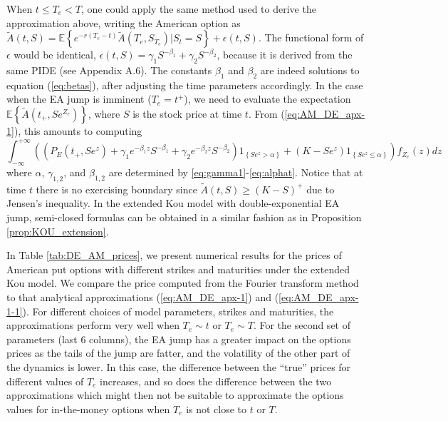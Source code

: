 \documentclass[11pt]{article}
\numberwithin{equation}{section}
\numberwithin{theorem}{section}
\begin{document}
When $t\leq T_{e}<T$, one could apply the same method used to derive
the approximation above, writing the American option as $\tilde{A}\left(t,S\right)=\mathbb{E}\left\{ e^{-r\left(T_{e}-t\right)}\tilde{A}\left(T_{e},S_{T_{e}}\right)\vert S_{t}=S\right\} +\epsilon\left(t,S\right)$.
The functional form of $\epsilon$ would be identical, $\epsilon\left(t,S\right)=\gamma_{1}S^{-\beta_{1}}+\gamma_{2}S^{-\beta_{2}}$,
because it is derived from the same PIDE (see Appendix A.6).
The  constants $\beta_1$ and $\beta_2$ are indeed solutions to   equation (\ref{eq:betas}),
after adjusting the time parameters accordingly.  In the case  when the EA jump is imminent ($T_{e}=t^{+}$), we need to  evaluate the
expectation $\mathbb{E}\left\{ \tilde{A}\left(t_{+},Se^{Z_{e}}\right)\right\} $,
where $S$ is the stock price at time $t$. From (\ref{eq:AM_DE_apx-1}), 
this amounts to computing 
\begin{equation}
\int_{-\infty}^{+\infty} \left(\left(P_{E}\left(t_{+},Se^{z}\right)+\gamma_{1}e^{-\beta_{1}z}S^{-\beta_{1}}+\gamma_{2}e^{-\beta_{2}z}S^{-\beta_{2}}\right)1_{\left\{Se^{z}>\alpha\right\}}+\left(K-Se^{z}\right)1_{\left\{Se^{z}\leq\alpha\right\}}\right)f_{Z_e}\left(z\right)dz \label{eq:AM_DE_apx-1-1}
\end{equation}
where $\alpha$, $\gamma_{1,2}$, and $\beta_{1,2}$ are determined by
\eqref{eq:gamma1}-\eqref{eq:alphat}. Notice that at time $t$ there is no exercising boundary since  $\tilde{A}\left(t,S\right)\geq\left(K-S\right)^{+}$
due to Jensen's inequality.   In the extended Kou model 
with double-exponential EA jump, semi-closed formulas can be obtained 
in a similar fashion as in Proposition \ref{prop:KOU_extension}.  

In Table \ref{tab:DE_AM_prices},  we present numerical results for
the prices of     American put options with different strikes and maturities under the extended Kou model.
We compare the price computed  from  the Fourier transform method to that  analytical approximations (\ref{eq:AM_DE_apx-1}) and (\ref{eq:AM_DE_apx-1-1}).
For  different choices of model parameters, strikes and maturities, the approximations  perform
very  well when $T_{e}\sim t$ or $T_{e}\sim T$. For the second
set of   parameters (last 6 columns), the EA jump
has a greater impact on the options prices as the tails of the jump
are fatter, and the volatility of the other part of the dynamics is
lower. In this case, the difference between the ``true'' prices
for different values of $T_{e}$ increases, and so does the difference
between the two approximations which might then not be suitable to
approximate the options values for in-the-money options when $T_{e}$
is not close to $t$ or $T$. 
\end{document}
